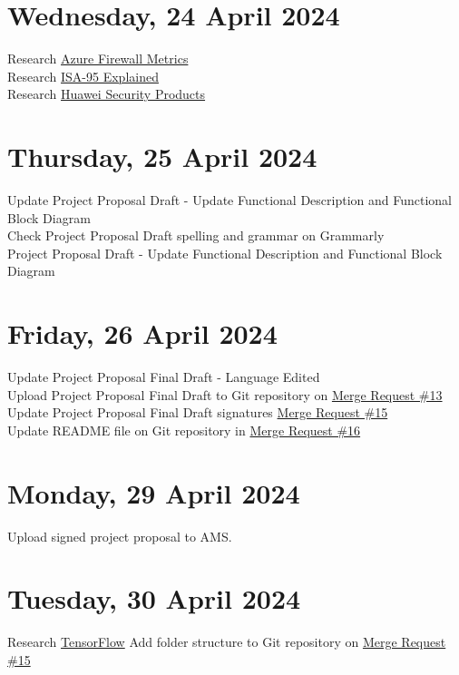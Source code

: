 \section[2024/04/24]{Wednesday, 24 April 2024}
Research \href{https://learn.microsoft.com/en-us/azure/firewall/metrics}{Azure Firewall Metrics}\\
Research \href{https://www.mesengineer.com/2023/08/20/isa-95-explained/}{ISA-95 Explained}\\
Research \href{https://e.huawei.com/fr/products/security}{Huawei Security Products}\\
\pendsign

\section[2024/04/25]{Thursday, 25 April 2024}
Update Project Proposal Draft - Update Functional Description and Functional Block Diagram\\
Check Project Proposal Draft spelling and grammar on Grammarly\\
Project Proposal Draft - Update Functional Description and Functional Block Diagram
\pendsign

\section[2024/04/26]{Friday, 26 April 2024}
Update Project Proposal Final Draft - Language Edited\\
Upload Project Proposal Final Draft to Git repository on \href{https://repo.ee.up.ac.za/eece_ugfyp_tg/2024_isg/tg4-koot-u20426471/-/merge_requests/13}{Merge Request \#13}\\
Update Project Proposal Final Draft signatures \href{https://repo.ee.up.ac.za/eece_ugfyp_tg/2024_isg/tg4-koot-u20426471/-/merge_requests/15}{Merge Request \#15}\\
Update README file on Git repository in \href{https://repo.ee.up.ac.za/eece_ugfyp_tg/2024_isg/tg4-koot-u20426471/-/merge_requests/16}{Merge Request \#16}\\
\pendsign

\section[2024/04/29]{Monday, 29 April 2024}
Upload signed project proposal to AMS.\\
\pendsign

\section[2024/04/30]{Tuesday, 30 April 2024}
Research \href{https://www.tensorflow.org/}{TensorFlow}
Add folder structure to Git repository on \href{https://repo.ee.up.ac.za/eece_ugfyp_tg/2024_isg/tg4-koot-u20426471/-/merge_requests/15}{Merge Request \#15}\\
\pendsign

